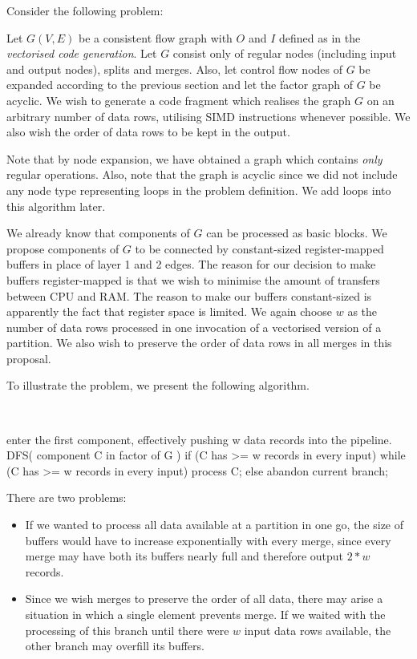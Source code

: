 Consider the following problem:

\label{sec:crawler}

  Let $G(V,E)$ be a consistent flow graph with $O$ and $I$ defined as in the \emph{vectorised code generation}. Let $G$ consist only of regular nodes (including input and output nodes), splits and merges.  Also, let control flow nodes of $G$ be expanded according to the previous section and let the factor graph of $G$ be acyclic. We wish to generate a code fragment which realises the graph $G$ on an arbitrary number of data rows, utilising SIMD instructions whenever possible. We also wish the order of data rows to be kept in the output.
\myendprob

\begin{rem} 
Note that by node expansion, we have obtained a graph which contains \emph{only} regular operations. Also, note that the graph is acyclic since we did not include any node type representing loops in the problem definition. We add loops into this algorithm later.
\end{rem}

We already know that components of $G$ can be processed as basic blocks. We propose components of $G$ to be connected by constant-sized register-mapped buffers in place of layer 1 and 2 edges. The reason for our decision to make buffers register-mapped is that we wish to minimise the amount of transfers between CPU and RAM. The reason to make our buffers constant-sized is apparently the fact that register space is limited. We again choose $w$ as the number of data rows processed in one invocation of a vectorised version of a partition. We also wish to preserve the order of data rows in all merges in this proposal.


To illustrate the problem, we present the following algorithm.

 \ 
\begin{code}
enter the first component, 
  effectively pushing w data records into the pipeline.
DFS( component C in factor of G )
{
  if (C has >= w records in every input)
    while (C has >= w records in every input)
      process C;
  else
    abandon current branch;
}
\end{code}
\myendalg

There are two problems:

\begin{itemize}
  \item If we wanted to process all data available at a partition in one go, the size of buffers would have to increase exponentially with every merge, since every merge may have both its buffers nearly full and therefore output $2*w$ records.
  \item Since we wish merges to preserve the order of all data, there may arise a situation in which a single element prevents merge. If we waited with the processing of this branch until there were $w$ input data rows available, the other branch may overfill its buffers.
\end{itemize}

